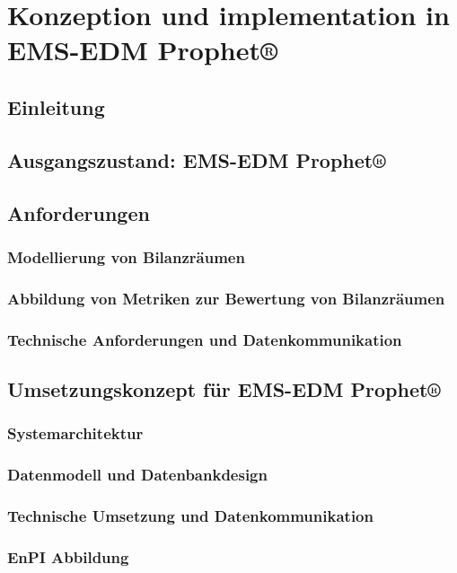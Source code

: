 \documentclass[a4paper,10pt,twoside]{report}
\begin{document}
\chapter{Konzeption und implementation in EMS-EDM Prophet®}
\section{Einleitung}

\section{Ausgangszustand: EMS-EDM Prophet®}

\section{Anforderungen}
\subsection{Modellierung von Bilanzräumen}

\subsection{Abbildung von Metriken zur Bewertung von Bilanzräumen}

\subsection{Technische Anforderungen und Datenkommunikation}


\section{Umsetzungskonzept für EMS-EDM Prophet®}

\subsection{Systemarchitektur}
\subsection{Datenmodell und Datenbankdesign}
\subsection{Technische Umsetzung und Datenkommunikation}
\subsection{EnPI Abbildung}
\end{document}
